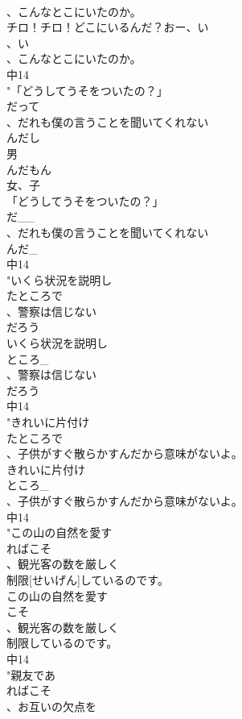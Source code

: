\documentclass[8pt]{extreport}
\begin{document}
\begin{CJK}{UTF8}{min}
\\	、こんなとこにいたのか。
\\	チロ！チロ！どこにいるんだ？おー、い
\\	、い
\\	、こんなとこにいたのか。
\\	中14
\\	"「どうしてうそをついたの？」
\\	だって
\\	、だれも僕の言うことを聞いてくれない
\\	んだし
\\	男
\\	んだもん
\\	女、子
\\	「どうしてうそをついたの？」
\\	だ__
\\	、だれも僕の言うことを聞いてくれない
\\	んだ_
\\	中14
\\	"いくら状況を説明し
\\	たところで
\\	、警察は信じない
\\	だろう
\\	いくら状況を説明し
\\	ところ_
\\	、警察は信じない
\\	だろう
\\	中14
\\	"きれいに片付け
\\	たところで
\\	、子供がすぐ散らかすんだから意味がないよ。
\\	きれいに片付け
\\	ところ_
\\	、子供がすぐ散らかすんだから意味がないよ。
\\	中14
\\	"この山の自然を愛す
\\	ればこそ
\\	、観光客の数を厳しく
\\	制限[せいげん]しているのです。
\\	この山の自然を愛す
\\	こそ
\\	、観光客の数を厳しく
\\	制限しているのです。
\\	中14
\\	"親友であ
\\	ればこそ
\\	、お互いの欠点を

\end{CJK}
\end{document}
